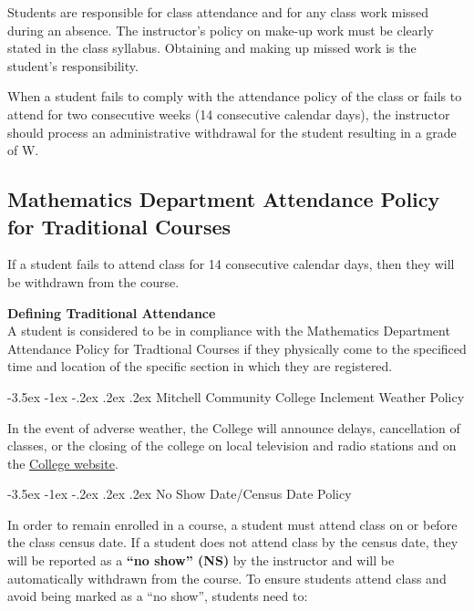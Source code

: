 \documentclass{article}
\makeatletter
\renewcommand\section{\@startsection{section}{1}{0pt}%
  {-3.5ex \@plus -1ex \@minus -.2ex}%
  {.2ex \@plus.2ex}%
  {\normalfont\Large\bfseries}} %
\renewenvironment{framed}[1][]{%
  \def\FrameCommand{%
    \hspace{1pt}%
    {\color{mybordercolor}\vrule width 2pt} %
    \hspace{1pt}%
    \fboxsep=\FrameSep%
    \colorbox{mybgcolor}%
  }%
  \MakeFramed {\advance\hsize-\width \FrameRestore}%
}{%
  \endMakeFramed
}
\makeatother
\begin{document}
Students are responsible for class attendance and for any class work missed during an absence. The instructor's policy on make-up work must be clearly stated in the class syllabus. Obtaining and making up missed work is the student's responsibility.

When a student fails to comply with the attendance policy of the class or fails to attend for two consecutive weeks (14 consecutive calendar days), the instructor should process an administrative withdrawal for the student resulting in a grade of W.

\subsection{Mathematics Department Attendance Policy for Traditional Courses}

If a student fails to attend class for 14 consecutive calendar days, then they will be withdrawn from the course.

\begin{framed}
\textbf{Defining Traditional Attendance}\\
A student is considered to be in compliance with the Mathematics Department Attendance Policy for Tradtional Courses if they physically come to the specificed time and location of the specific section in which they are registered.
\end{framed}

\section{Mitchell Community College Inclement Weather Policy}

In the event of adverse weather, the College will announce delays, cancellation of classes, or the closing of the college on local television and radio stations and on the \href{https://www.mitchellcc.edu}{College website}.

\section{No Show Date/Census Date Policy}

In order to remain enrolled in a course, a student must attend class on or before the class census date. If a student does not attend class by the census date, they will be reported as a \textbf{``no show'' (NS)} by the instructor and will be automatically withdrawn from the course.  To ensure students attend class and avoid being marked as a ``no show'', students need to:
\end{document}
